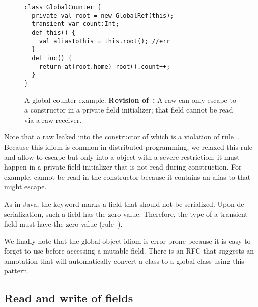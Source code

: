 {%

\begin{figure}
\vspace{-0.2cm}\begin{lstlisting}
class GlobalCounter {
  private val root = new GlobalRef(this);
  transient var count:Int;
  def this() {
    val aliasToThis = this.root(); //err
  }
  def inc() {
    return at(root.home) root().count++;
  }
}
\end{lstlisting}\vspace{-0.2cm}
\caption{A global counter example.
    \textbf{Revision of~:}
        A raw \this can only escape to a  constructor in a private field initializer;
            that field cannot be read via a raw \this receiver.
    }
\label{Figure:GlobalRef}
\end{figure}

Note that a raw \this leaked into the constructor of 
    which is a violation of rule~.
Because this idiom is common in distributed programming,
    we relaxed this rule and allow \this to escape but only into a  object
    with a severe restriction:
    it must happen in a private field initializer that is not read during construction.
For example,  cannot be read in the constructor
    because it contains an alias to  that might escape.

As in Java, the  keyword marks a field that should not be serialized.
Upon de-serialization, such a field has the zero value.
Therefore, the type of a transient field must have the zero value (rule~).

We finally note that the global object idiom is error-prone because
    it is easy to forget to use  before accessing a mutable field.
There is an RFC that suggests an annotation that will automatically convert a class to a global class
    using this pattern.


}


\subsection{Read and write of fields}
\label{Section:Read-write-rules}


